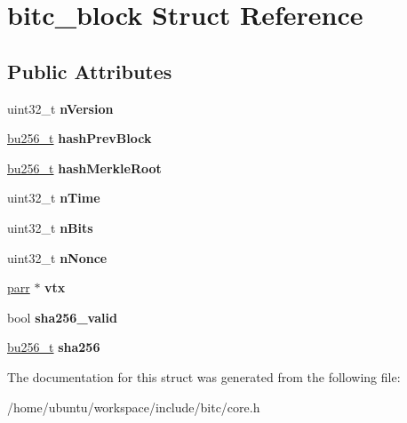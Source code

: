 \hypertarget{structbitc__block}{\section{bitc\-\_\-block Struct Reference}
\label{structbitc__block}
}
\subsection*{Public Attributes}
\begin{DoxyCompactItemize}
\item 
\hypertarget{structbitc__block_a591e98a5229b068398040bba62d892ef}{uint32\-\_\-t {\bfseries n\-Version}}\label{structbitc__block_a591e98a5229b068398040bba62d892ef}

\item 
\hypertarget{structbitc__block_af8ec470a8c56f3ef54dc7f87f86ce551}{\hyperlink{structbu256}{bu256\-\_\-t} {\bfseries hash\-Prev\-Block}}\label{structbitc__block_af8ec470a8c56f3ef54dc7f87f86ce551}

\item 
\hypertarget{structbitc__block_ad73c6c3699c2d14e386f321fd39b49fb}{\hyperlink{structbu256}{bu256\-\_\-t} {\bfseries hash\-Merkle\-Root}}\label{structbitc__block_ad73c6c3699c2d14e386f321fd39b49fb}

\item 
\hypertarget{structbitc__block_a12d6e53083811c90368d9f9ef6b2bfbf}{uint32\-\_\-t {\bfseries n\-Time}}\label{structbitc__block_a12d6e53083811c90368d9f9ef6b2bfbf}

\item 
\hypertarget{structbitc__block_aa86bde897930f59b7eb9c6f85f883b1d}{uint32\-\_\-t {\bfseries n\-Bits}}\label{structbitc__block_aa86bde897930f59b7eb9c6f85f883b1d}

\item 
\hypertarget{structbitc__block_a56274bbb9eaea2c9499d8a9956167ad0}{uint32\-\_\-t {\bfseries n\-Nonce}}\label{structbitc__block_a56274bbb9eaea2c9499d8a9956167ad0}

\item 
\hypertarget{structbitc__block_aee61b95ed2196ce1467ade48319f3820}{\hyperlink{structparr}{parr} $\ast$ {\bfseries vtx}}\label{structbitc__block_aee61b95ed2196ce1467ade48319f3820}

\item 
\hypertarget{structbitc__block_ab15803ef48e03daebc06fdbf209ad5da}{bool {\bfseries sha256\-\_\-valid}}\label{structbitc__block_ab15803ef48e03daebc06fdbf209ad5da}

\item 
\hypertarget{structbitc__block_ad02efa9a72cb5f043ca33d520174425b}{\hyperlink{structbu256}{bu256\-\_\-t} {\bfseries sha256}}\label{structbitc__block_ad02efa9a72cb5f043ca33d520174425b}

\end{DoxyCompactItemize}


The documentation for this struct was generated from the following file\-:\begin{DoxyCompactItemize}
\item 
/home/ubuntu/workspace/include/bitc/core.\-h\end{DoxyCompactItemize}
